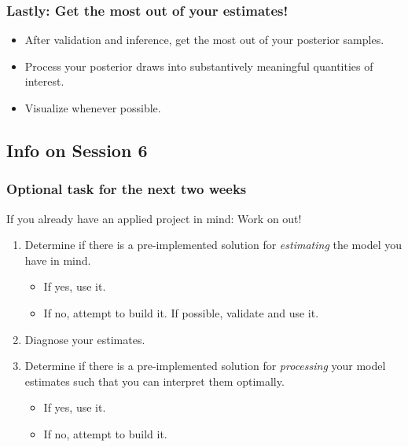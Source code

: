 \documentclass[
  11pt,
]{article}
\providecommand{\tightlist}{%
  \setlength{\itemsep}{0pt}\setlength{\parskip}{0pt}}
\begin{document}
\hypertarget{lastly-get-the-most-out-of-your-estimates}{%
\subsubsection{Lastly: Get the most out of your estimates!}\label{lastly-get-the-most-out-of-your-estimates}}

\begin{itemize}
\tightlist
\item
  After validation and inference, get the most out of your posterior samples.
\item
  Process your posterior draws into substantively meaningful quantities of interest.
\item
  Visualize whenever possible.
\end{itemize}

\hypertarget{info-on-session-6}{%
\subsection{Info on Session 6}\label{info-on-session-6}}

\hypertarget{optional-task-for-the-next-two-weeks}{%
\subsubsection{Optional task for the next two weeks}\label{optional-task-for-the-next-two-weeks}}

If you already have an applied project in mind: Work on out!

\begin{enumerate}
\def\labelenumi{\arabic{enumi}.}
\tightlist
\item
  Determine if there is a pre-implemented solution for \emph{estimating} the model you have in mind.

  \begin{itemize}
  \tightlist
  \item
    If yes, use it.
  \item
    If no, attempt to build it. If possible, validate and use it.
  \end{itemize}
\item
  Diagnose your estimates.
\item
  Determine if there is a pre-implemented solution for \emph{processing} your model estimates such that you can interpret them optimally.

  \begin{itemize}
  \tightlist
  \item
    If yes, use it.
  \item
    If no, attempt to build it.
  \end{itemize}
\end{enumerate}
\end{document}
